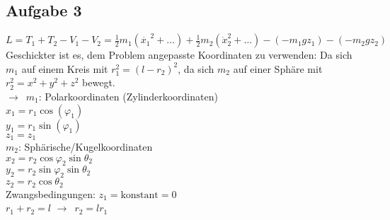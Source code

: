 \documentclass[oneside]{book}
\theoremstyle{definition}
\newcommand{\conseq}{$\rightarrow$~}
\newcommand{\vp}{\varphi}
\begin{document}
\subsection{Aufgabe 3}
$L = T_1 + T_2 - V_1 - V_2 = \frac12 m_1(\dot{x_1}^2 + \dots) + \frac12 m_2 (\dot{x}_2^2 + \dots) - (- m_1 g z_1) - (- m_2 g z_2)$\\
Geschickter ist es, dem Problem angepasste Koordinaten zu verwenden: Da sich $m_1$ auf einem Kreis mit $r_1^2 = (l-r_2)^2$, da sich $m_2$ auf einer Sphäre mit $r_2^2 = x^2 + y^2 + z^2$ bewegt.\\
\conseq $m_1$: Polarkoordinaten (Zylinderkoordinaten)\\
$x_1 = r_1 \cos(\vp_1)$\\
$y_1 = r_1 \sin(\vp_1)$\\
$z_1 = z_1$\\
$m_2$: Sphärische/Kugelkoordinaten\\
$x_2 = r_2 \cos\vp_2 \sin \theta_2$\\
$y_2 = r_2 \sin \vp_2 \sin \theta_2$\\
$z_2 = r_2 \cos \theta_2$\\
Zwangsbedingungen: $z_1 = \text{konstant} = 0$\\
$r_1 + r_2 = l$ \conseq $r_2 = l r_1$
\end{document}
